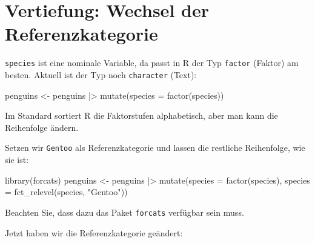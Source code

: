\documentclass[
  ngerman,
  letterpaper,
  twoside,
  open=any]{scrbook}
\newenvironment{Shaded}{\begin{snugshade}}{\end{snugshade}}
\newcommand{\AttributeTok}[1]{\textcolor[rgb]{0.40,0.45,0.13}{#1}}
\newcommand{\DocumentationTok}[1]{\textcolor[rgb]{0.37,0.37,0.37}{\textit{#1}}}
\newcommand{\FunctionTok}[1]{\textcolor[rgb]{0.28,0.35,0.67}{#1}}
\newcommand{\NormalTok}[1]{\textcolor[rgb]{0.00,0.23,0.31}{#1}}
\newcommand{\OtherTok}[1]{\textcolor[rgb]{0.00,0.23,0.31}{#1}}
\newcommand{\SpecialCharTok}[1]{\textcolor[rgb]{0.37,0.37,0.37}{#1}}
\newcommand{\StringTok}[1]{\textcolor[rgb]{0.13,0.47,0.30}{#1}}
\theoremstyle{definition}
\theoremstyle{plain}
\theoremstyle{definition}
\theoremstyle{definition}
\theoremstyle{definition}
\theoremstyle{definition}
\theoremstyle{remark}
\begin{document}
\section{Vertiefung: Wechsel der
Referenzkategorie}\label{vertiefung-wechsel-der-referenzkategorie}

\texttt{species} ist eine nominale Variable, da passt in R der Typ
\texttt{factor} (Faktor) am besten. Aktuell ist der Typ noch
\texttt{character} (Text):

\begin{Shaded}
\begin{Highlighting}[]
\NormalTok{penguins }\OtherTok{\textless{}{-}}\NormalTok{ penguins }\SpecialCharTok{|\textgreater{}} 
  \FunctionTok{mutate}\NormalTok{(}\AttributeTok{species =} \FunctionTok{factor}\NormalTok{(species))}
\end{Highlighting}
\end{Shaded}

Im Standard sortiert R die Faktorstufen alphabetisch, aber man kann die
Reihenfolge ändern.

\begin{Shaded}
\end{Shaded}

Setzen wir \texttt{Gentoo} als Referenzkategorie und lassen die
restliche Reihenfolge, wie sie ist:

\begin{Shaded}
\begin{Highlighting}[]
\FunctionTok{library}\NormalTok{(forcats)}
\NormalTok{penguins }\OtherTok{\textless{}{-}}\NormalTok{ penguins }\SpecialCharTok{|\textgreater{}} 
  \FunctionTok{mutate}\NormalTok{(}\AttributeTok{species =} \FunctionTok{factor}\NormalTok{(species),}
    \AttributeTok{species =} \FunctionTok{fct\_relevel}\NormalTok{(species, }\StringTok{"Gentoo"}\NormalTok{))}
\end{Highlighting}
\end{Shaded}

Beachten Sie, dass dazu das Paket \texttt{forcats} verfügbar sein muss.

Jetzt haben wir die Referenzkategorie geändert:

\begin{Shaded}
\end{Shaded}
\end{document}

